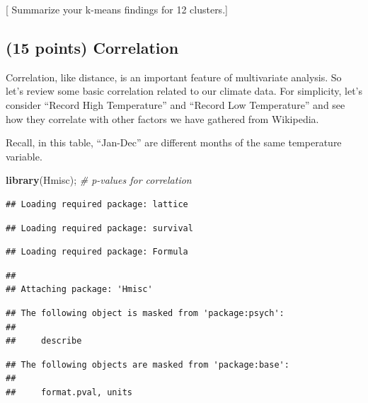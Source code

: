 \documentclass[
]{article}
\newenvironment{Shaded}{\begin{snugshade}}{\end{snugshade}}
\newcommand{\CommentTok}[1]{\textcolor[rgb]{0.56,0.35,0.01}{\textit{#1}}}
\newcommand{\KeywordTok}[1]{\textcolor[rgb]{0.13,0.29,0.53}{\textbf{#1}}}
\newcommand{\NormalTok}[1]{#1}
\begin{document}
{[} Summarize your k-means findings for 12 clusters.{]}

\hypertarget{points-correlation}{%
\subsection{(15 points) Correlation}\label{points-correlation}}

Correlation, like distance, is an important feature of multivariate
analysis. So let's review some basic correlation related to our climate
data. For simplicity, let's consider ``Record High Temperature'' and
``Record Low Temperature'' and see how they correlate with other factors
we have gathered from Wikipedia.

Recall, in this table, ``Jan-Dec'' are different months of the same
temperature variable.

\begin{Shaded}
\begin{Highlighting}[]
\KeywordTok{library}\NormalTok{(Hmisc); }\CommentTok{\# p{-}values for correlation}
\end{Highlighting}
\end{Shaded}

\begin{verbatim}
## Loading required package: lattice
\end{verbatim}

\begin{verbatim}
## Loading required package: survival
\end{verbatim}

\begin{verbatim}
## Loading required package: Formula
\end{verbatim}

\begin{verbatim}
## 
## Attaching package: 'Hmisc'
\end{verbatim}

\begin{verbatim}
## The following object is masked from 'package:psych':
## 
##     describe
\end{verbatim}

\begin{verbatim}
## The following objects are masked from 'package:base':
## 
##     format.pval, units
\end{verbatim}
\end{document}
